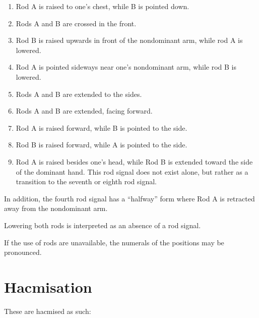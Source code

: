 \documentclass{book}
\begin{document}
\begin{enumerate}
    \item Rod A is raised to one's chest, while B is pointed down.
    \item Rods A and B are crossed in the front.
    \item Rod B is raised upwards in front of the nondominant arm, while rod A is lowered.
    \item Rod A is pointed sideways near one's nondominant arm, while rod B is lowered.
    \item Rods A and B are extended to the sides.
    \item Rods A and B are extended, facing forward.
    \item Rod A is raised forward, while B is pointed to the side.
    \item Rod B is raised forward, while A is pointed to the side.
    \item Rod A is raised besides one's head, while Rod B is extended toward the side of the dominant hand. This rod signal does not exist alone, but rather as a transition to the seventh or eighth rod signal.
\end{enumerate}

In addition, the fourth rod signal has a ``halfway'' form where Rod A is retracted away from the nondominant arm.

Lowering both rods is interpreted as an absence of a rod signal.

If the use of rods are unavailable, the numerals of the positions may be pronounced.

\section{Hacmisation}

These are hacmised as such:
\end{document}
